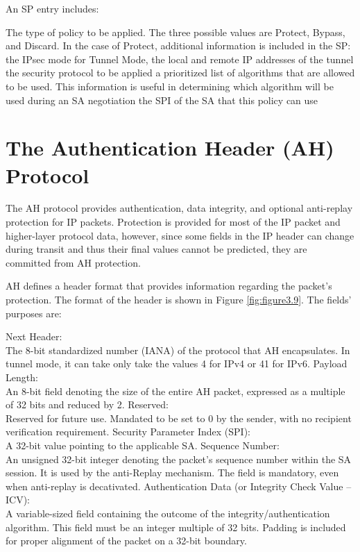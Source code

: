 An SP entry includes:

\begin{outline}
\1 The type of policy to be applied. The three possible values are Protect, Bypass, and Discard. In the case of Protect, additional information is included in the SP:
\2 the IPsec mode
\2 for Tunnel Mode, the local and remote IP addresses of the tunnel
\2 the security protocol to be applied
\2 a prioritized list of algorithms that are allowed to be used. This information is useful in determining which algorithm will be used during an SA negotiation
\2 the SPI of the SA that this policy can use
\end{outline}

\section{The Authentication Header (AH) Protocol}
The AH protocol provides authentication, data integrity, and optional anti-replay protection for IP packets. Protection is provided for most of the IP packet and higher-layer protocol data,  however, since some fields in the IP header can change during transit and thus their final values cannot be predicted, they are committed from AH protection.

AH defines a header format that provides information regarding the packet's protection. The format of the header is shown in Figure \ref{fig:figure3.9}. The fields' purposes are:

\begin{outline}
\1 Next Header: \\The 8-bit standardized number (IANA) of the protocol that AH encapsulates. In tunnel mode, it can take only take the values 4 for IPv4 or 41  for IPv6.
\1 Payload Length: \\An 8-bit field denoting the size of the entire AH packet, expressed as a multiple of 32 bits and reduced by 2.
\1 Reserved: \\Reserved for future use. Mandated to be set to 0 by the sender, with no recipient verification requirement.
\1 Security Parameter Index (SPI):\\ A 32-bit value pointing to the applicable SA.
\1 Sequence Number: \\An unsigned 32-bit integer denoting the packet's sequence number within the SA session. It is used by the anti-Replay mechanism. The field is mandatory, even when anti-replay is decativated.
\1 Authentication Data (or Integrity Check Value – ICV):\\ A variable-sized field containing the outcome of the integrity/authentication algorithm. This field must be an integer multiple of 32 bits. Padding is included for proper alignment of the packet on a 32-bit boundary.
\end{outline}

